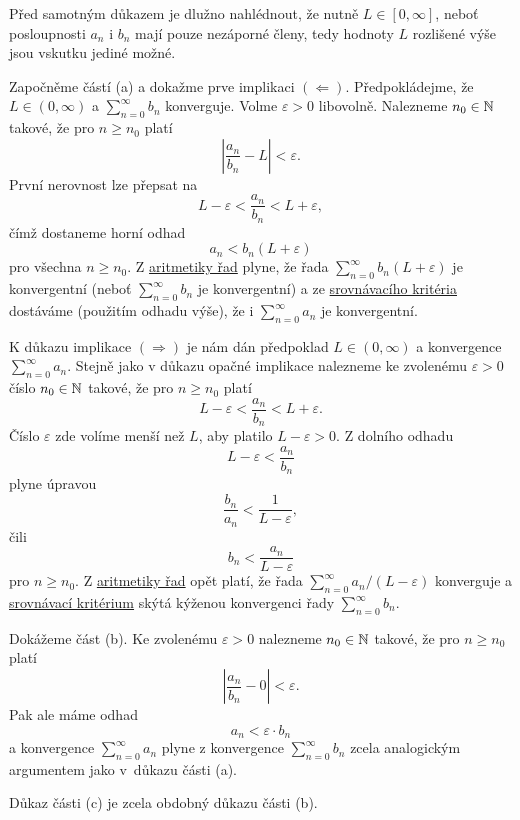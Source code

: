 \begin{thmproof}
 Před samotným důkazem je dlužno nahlédnout, že nutně $L \in [0,\infty]$, neboť
 posloupnosti $a_n$ i $b_n$ mají pouze nezáporné členy, tedy hodnoty $L$
 rozlišené výše jsou vskutku jediné možné.

 Započněme částí (a) a dokažme prve implikaci $( \Leftarrow )$. Předpokládejme,
 že $L \in (0,\infty)$ a $\sum_{n = 0}^{\infty} b_n$ konverguje. Volme
 $\varepsilon>0$ libovolně. Nalezneme $n_0 \in \mathbb{N}$ takové, že pro $n \geq n_0$
 platí
 \[
  \left| \frac{a_n}{b_n} - L \right| < \varepsilon.
 \]
 První nerovnost lze přepsat na
 \[
  L - \varepsilon < \frac{a_n}{b_n} < L + \varepsilon,
 \]
 čímž dostaneme horní odhad
 \[
  a_n < b_n(L + \varepsilon)
 \]
 pro všechna $n \geq n_0$. Z \hyperref[prop:aritmetika-ciselnych-rad]{aritmetiky
 řad} plyne, že řada $\sum_{n = 0}^{\infty} b_n(L + \varepsilon)$ je
 konvergentní (neboť $\sum_{n = 0}^{\infty} b_n$ je konvergentní) a ze
 \hyperref[prop:srovnavaci-kriterium]{srovnávacího kritéria} dostáváme (použitím
 odhadu výše), že i $\sum_{n = 0}^{\infty} a_n$ je konvergentní.

 K důkazu implikace $( \Rightarrow )$ je nám dán předpoklad $L \in (0,\infty)$ a
 konvergence $\sum_{n = 0}^{\infty} a_n$. Stejně jako v důkazu opačné implikace
 nalezneme ke zvolenému $\varepsilon>0$ číslo $n_0 \in \mathbb{N}$ takové, že pro $n
 \geq n_0$ platí 
 \[
  L - \varepsilon < \frac{a_n}{b_n} < L + \varepsilon.
 \]
 Číslo $\varepsilon$ zde volíme menší než $L$, aby platilo $L - \varepsilon >
 0$. Z dolního odhadu
 \[
  L - \varepsilon < \frac{a_n}{b_n}
 \]
 plyne úpravou
 \[
  \frac{b_n}{a_n} < \frac{1}{L-\varepsilon},
 \]
 čili
 \[
  b_n < \frac{a_n}{L-\varepsilon}
 \]
 pro $n \geq n_0$. Z \hyperref[prop:aritmetika-ciselnych-rad]{aritmetiky řad}
 opět platí, že řada $\sum_{n = 0}^{\infty} a_n / (L-\varepsilon)$ konverguje a
 \hyperref[prop:srovnavaci-kriterium]{srovnávací kritérium} skýtá kýženou
 konvergenci řady $\sum_{n = 0}^{\infty} b_n$.

 Dokážeme část (b). Ke zvolenému $\varepsilon>0$ nalezneme $n_0 \in \mathbb{N}$ takové,
 že pro $n \geq n_0$ platí
 \[
  \left| \frac{a_n}{b_n} - 0 \right| < \varepsilon.
 \]
 Pak ale máme odhad
 \[
  a_n < \varepsilon \cdot b_n
 \]
 a konvergence $\sum_{n = 0}^{\infty} a_n$ plyne z konvergence $\sum_{n =
 0}^{\infty} b_n$ zcela analogickým argumentem jako v~důkazu části (a).

 Důkaz části (c) je zcela obdobný důkazu části (b).
\end{thmproof}


